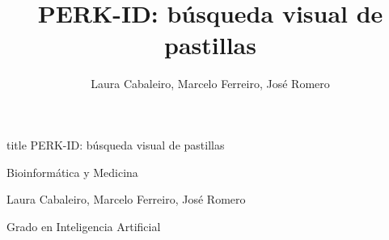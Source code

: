 \documentclass[aspectratio=169,11pt]{beamer}
\title[PERK-ID]{\protect\centering PERK-ID: búsqueda visual de pastillas}
\author{Laura Cabaleiro, Marcelo Ferreiro, José Romero}
\institute{Grado en Inteligencia Artificial}
\date{}
\begin{document}
\begin{frame}[plain]
  \centering
  \vfill

  \hspace*{-0.02\paperwidth}
  \begin{beamercolorbox}[
    wd=0.80\paperwidth,
    sep=1em,
    center,
    rounded=true,
    shadow=true
  ]{title}
    {\LARGE PERK-ID: búsqueda visual de pastillas}
  \end{beamercolorbox}

  \vspace{0.65cm}

  {\Large Bioinformática y Medicina}

  \vspace{0.35cm}

  {\normalsize Laura Cabaleiro, Marcelo Ferreiro, José Romero}

  \vspace{0.20cm}

  {\normalsize Grado en Inteligencia Artificial}

  \vfill
\end{frame}
\end{document}
